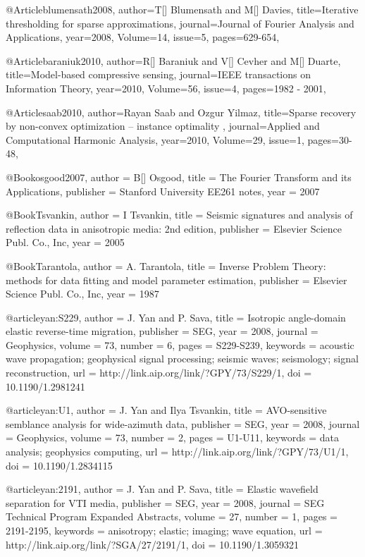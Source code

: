 {@Article{blumensath2008,
  author={T[] Blumensath and M[] Davies},
  title={Iterative thresholding for sparse approximations},
  journal={Journal of Fourier Analysis and Applications},
  year=2008,
  Volume=14,
  issue=5,
  pages={629-654},
}

@Article{baraniuk2010,
  author={R[] Baraniuk and V[] Cevher and M[] Duarte},
  title={Model-based compressive sensing},
  journal={IEEE transactions on Information Theory},
  year=2010,
  Volume=56,
  issue=4,
  pages={1982 - 2001},
}

@Article{saab2010,
  author={Rayan Saab and Ozgur Yilmaz},
  title={Sparse recovery by non-convex optimization – instance optimality },
  journal={Applied and Computational Harmonic Analysis},
  year=2010,
  Volume=29,
  issue=1,
  pages={30-48},
}

@Book{osgood2007,
  author =	 {B[] Osgood},
  title =	 {The Fourier Transform and its Applications},
  publisher =	 {Stanford University EE261 notes},
  year =	 2007
}

@Book{Tsvankin,
  author =	 {I Tsvankin},
  title =	 {Seismic signatures and analysis of reflection data
                  in anisotropic media: 2nd edition},
  publisher =	 {Elsevier Science Publ. Co., Inc},
  year =	 2005
}

@Book{Tarantola,
  author = 	 {A. Tarantola},
  title = 	 {Inverse {P}roblem {T}heory: methods for data
                 fitting and model parameter estimation},
  publisher = 	 {Elsevier Science Publ. Co., Inc},
  year = 	 1987
}

@article{yan:S229,
  author =	 {J. Yan and P. Sava},
  title =	 {Isotropic angle-domain elastic reverse-time
                  migration},
  publisher =	 {SEG},
  year =	 2008,
  journal =	 {Geophysics},
  volume =	 73,
  number =	 6,
  pages =	 {S229-S239},
  keywords =	 {acoustic wave propagation; geophysical signal
                  processing; seismic waves; seismology; signal
                  reconstruction},
  url =		 {http://link.aip.org/link/?GPY/73/S229/1},
  doi =		 {10.1190/1.2981241}
}

@article{yan:U1,
  author =	 {J. Yan and Ilya Tsvankin},
  title =	 {AVO-sensitive semblance analysis for wide-azimuth
                  data},
  publisher =	 {SEG},
  year =	 2008,
  journal =	 {Geophysics},
  volume =	 73,
  number =	 2,
  pages =	 {U1-U11},
  keywords =	 {data analysis; geophysics computing},
  url =		 {http://link.aip.org/link/?GPY/73/U1/1},
  doi =		 {10.1190/1.2834115}
}

@article{yan:2191,
  author =	 {J. Yan and P. Sava},
  title =	 {Elastic wavefield separation for {VTI} media},
  publisher =	 {SEG},
  year =	 2008,
  journal =	 {SEG Technical Program Expanded Abstracts},
  volume =	 27,
  number =	 1,
  pages =	 {2191-2195},
  keywords =	 {anisotropy; elastic; imaging; wave equation},
  url =		 {http://link.aip.org/link/?SGA/27/2191/1},
  doi =		 {10.1190/1.3059321}
}




}
